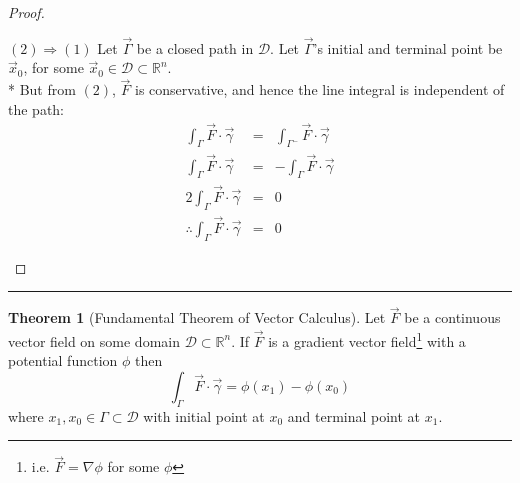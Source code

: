 \documentclass[10pt,a4paper]{report}
\theoremstyle{definition}
\newtheorem{theorem}{Theorem}[chapter]
\theoremstyle{plain}
\theoremstyle{definition}
\theoremstyle{plain}
\newenvironment{proofenv}{\begin{proof}}{\end{proof}{\par\centering\rule{3cm}{.1pt}\par}}
\newcommand{\real}{\mathbb{R}}
\newcommand{\domain}{\mathcal{D}}
\renewcommand{\implies}{\Rightarrow}
\begin{document}
\begin{proofenv}
\begin{trivlist}
        \item[$(2)\implies(1)$]
            Let $\vec{\Gamma}$ be a closed path in $\domain$. Let $\vec{\Gamma}$'s initial and terminal point be $\vec{x}_0$, for some $\vec{x}_0 \in \domain
            \subset \real^n$.\\*
            But from $(2)$, $\vec{F}$ is conservative, and hence the line integral is independent of the path:
            \begin{eqnarray*}
                \int_\Gamma \vec{F} \cdot \vec{\gamma} &=& \int_{\Gamma^-} \vec{F} \cdot \vec{\gamma} \\
                \int_\Gamma \vec{F} \cdot \vec{\gamma} &=& -\int_\Gamma \vec{F} \cdot \vec{\gamma} \\
                2\int_\Gamma \vec{F} \cdot \vec{\gamma} &=& 0 \\
                \therefore \int_\Gamma \vec{F} \cdot \vec{\gamma} &=& 0
            \end{eqnarray*}
    \end{trivlist}
\end{proofenv}

\begin{theorem}[Fundamental Theorem of Vector Calculus]\label{thm:1-4}
    Let $\vec{F}$ be a continuous vector field on some domain $\domain \subset \real^n$. If $\vec{F}$ is a gradient
    vector field\footnote{i.e. $\vec{F} = \nabla\phi$ for some $\phi$} with a potential function $\phi$ then
    \[
        \int_\Gamma \vec{F} \cdot \vec{\gamma} = \phi(x_1) - \phi(x_0)
    \]
    where $x_1,x_0 \in \Gamma \subset \domain$ with initial point at $x_0$ and terminal point at $x_1$.
\end{theorem}
\end{document}
